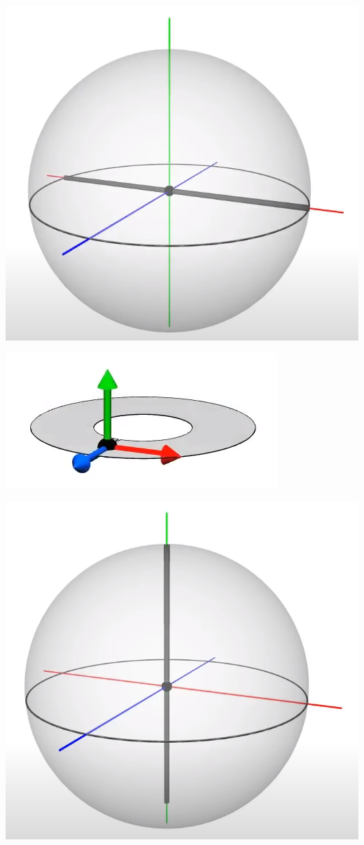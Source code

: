 \documentclass[10pt]{beamer}
\begin{document}
\begin{frame}
    \includegraphics[scale=0.1]{Pictures/xaxissphere.png}

    \includegraphics[scale=0.1]{Pictures/yaxisbelt.png}

    \includegraphics[scale=0.1]{Pictures/yaxissphere.png}


\end{frame}
\end{document}
